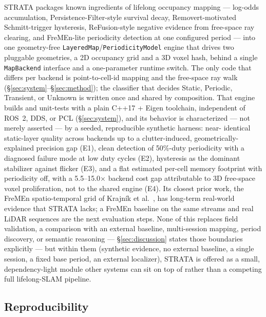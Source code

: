 \documentclass[conference]{IEEEtran}
\begin{document}
STRATA packages known ingredients of lifelong occupancy mapping --- log-odds
accumulation, Persistence-Filter-style survival decay, Removert-motivated
Schmitt-trigger hysteresis, ReFusion-style negative evidence from free-space
ray clearing, and FreMEn-lite periodicity detection at one configured
period --- into one geometry-free \texttt{LayeredMap}/\texttt{PeriodicityModel} engine
that drives two pluggable geometries, a 2D occupancy grid and a 3D voxel
hash, behind a single \texttt{MapBackend} interface and a one-parameter runtime
switch. The only code that differs per backend is point-to-cell-id mapping
and the free-space ray walk (\S\ref{sec:system}--\S\ref{sec:method}); the classifier that decides Static,
Periodic, Transient, or Unknown is written once and shared by composition.
That engine builds and unit-tests with a plain C++17 + Eigen toolchain,
independent of ROS~2, DDS, or PCL (\S\ref{sec:system}), and its behavior is characterized ---
not merely asserted --- by a seeded, reproducible synthetic harness: near-
identical static-layer quality across backends up to a clutter-induced,
geometrically-explained precision gap (E1), clean detection of 50\%-duty
periodicity with a diagnosed failure mode at low duty cycles (E2),
hysteresis as the dominant stabilizer against flicker (E3), and a flat
estimated per-cell memory footprint with periodicity off, with a
5.5--15.0$\times$ backend cost gap attributable to 3D free-space voxel
proliferation, not to the shared engine (E4). Its closest prior work, the
FreMEn spatio-temporal grid of Krajn\'ik et al.\ \cite{krajnik2016persistent},
has long-term real-world evidence that STRATA lacks; a FreMEn baseline on the
same streams and real LiDAR sequences are the next evaluation steps. None of
this replaces field validation, a comparison with an external baseline,
multi-session mapping, period discovery, or semantic reasoning ---
\S\ref{sec:discussion} states those boundaries explicitly --- but within them
(synthetic evidence, no external baseline, a single session, a fixed base
period, an external localizer), STRATA is offered as a small, dependency-light module other systems can sit on top
of rather than a competing full lifelong-SLAM pipeline.

\subsection{Reproducibility}
\end{document}
